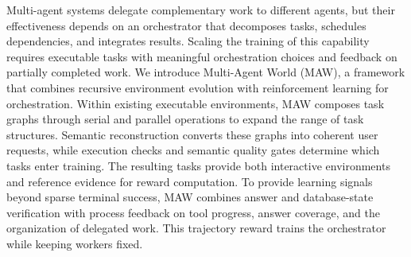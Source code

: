Multi-agent systems delegate complementary work to different agents, but their effectiveness depends on an orchestrator that decomposes tasks, schedules dependencies, and integrates results. Scaling the training of this capability requires executable tasks with meaningful orchestration choices and feedback on partially completed work. We introduce Multi-Agent World (MAW), a framework that combines recursive environment evolution with reinforcement learning for orchestration. Within existing executable environments, MAW composes task graphs through serial and parallel operations to expand the range of task structures. Semantic reconstruction converts these graphs into coherent user requests, while execution checks and semantic quality gates determine which tasks enter training. The resulting tasks provide both interactive environments and reference evidence for reward computation. To provide learning signals beyond sparse terminal success, MAW combines answer and database-state verification with process feedback on tool progress, answer coverage, and the organization of delegated work. This trajectory reward trains the orchestrator while keeping workers fixed. 
